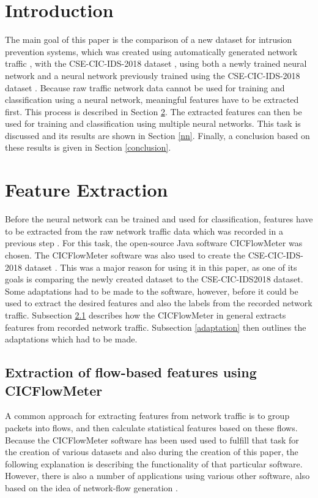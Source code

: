 \documentclass[conference]{IEEEtran}
\begin{document}
\section{Introduction}
The main goal of this paper is the comparison of a new dataset for intrusion prevention systems, which was created using automatically generated network traffic \cite{paper1}, with the CSE-CIC-IDS-2018 dataset \cite{max2}, using both a newly trained neural network and a neural network previously trained using the CSE-CIC-IDS-2018 dataset \cite{max1}. Because raw traffic network data cannot be used for training and classification using a neural network, meaningful features have to be extracted first. This process is described in Section \ref{extraction}. The extracted features can then be used for training and classification using multiple neural networks. This task is discussed and its results are shown in Section \ref{nn}. Finally, a conclusion based on these results is given in Section \ref{conclusion}.

\section{Feature Extraction}\label{extraction}
Before the neural network can be trained and used for classification, features have to be extracted from the raw network traffic data which was recorded in a previous step \cite{paper1}. For this task, the open-source Java software CICFlowMeter \cite{cicflowmeter} was chosen. The CICFlowMeter software was also used to create the CSE-CIC-IDS-2018 dataset \cite{max2}. This was a major reason for using it in this paper, as one of its goals is comparing the newly created dataset to the CSE-CIC-IDS2018 dataset. Some adaptations had to be made to the software, however, before it could be used to extract the desired features and also the labels from the recorded network traffic. Subsection \ref{extraction_using_cicflowmeter} describes how the CICFlowMeter in general extracts features from recorded network traffic. Subsection \ref{adaptation} then outlines the adaptations which had to be made.

\subsection{Extraction of flow-based features using CICFlowMeter}\label{extraction_using_cicflowmeter}
A common approach for extracting features from network traffic is to group packets into flows, and then calculate statistical features based on these flows. Because the CICFlowMeter software\cite{cicflowmeter} has been used used to fulfill that task for the creation of various datasets \cite{max2,sopuru,lashkari} and also during the creation of this paper, the following explanation is describing the functionality of that particular software. However, there is also a number of applications using various other software, also based on the idea of network-flow generation \cite{wang,moustafa,celik,waizumi}.
\end{document}
